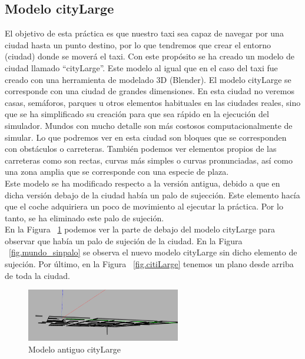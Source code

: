 \subsection{Modelo cityLarge}
El objetivo de esta práctica es que nuestro taxi sea capaz de navegar por una ciudad hasta un punto destino, por lo que tendremos que crear el entorno (ciudad) donde se moverá el taxi. Con este propósito se ha creado un modelo de ciudad llamado “cityLarge”. Este modelo al igual que en el caso del taxi fue creado con una herramienta de modelado 3D (Blender). El modelo cityLarge se corresponde con una ciudad de grandes dimensiones. En esta ciudad no veremos casas, semáforos, parques u otros elementos habituales en las ciudades reales, sino que se ha simplificado su creación para que sea rápido en la ejecución del simulador. Mundos con mucho detalle son más costosos computacionalmente de simular. Lo que podremos ver en esta ciudad son bloques que se corresponden con obstáculos o carreteras. También podemos ver elementos propios de las carreteras como son rectas, curvas más simples o curvas pronunciadas, así como una zona amplia que se corresponde con una especie de plaza.  \\

Este modelo se ha modificado respecto a la versión antigua, debido a que en dicha versión debajo de la ciudad había un palo de sujección. Este elemento hacía que el coche adquiriera un poco de movimiento al ejecutar la práctica. Por lo tanto, se ha eliminado este palo de sujeción. \\

En la Figura ~\ref{fig.mundo_palo} podemos ver la parte de debajo del modelo cityLarge para observar que había un palo de sujeción de la ciudad. En la Figura ~\ref{fig.mundo_sinpalo} se observa el nuevo modelo cityLarge sin dicho elemento de sujeción. Por último, en la Figura ~\ref{fig.citiLarge} tenemos un plano desde arriba de toda la ciudad.

\begin{figure}[H]
  \begin{center}
    \includegraphics[width=0.6\textwidth]{figures/GPP/Mundo_palo.png}
		\caption{Modelo antiguo cityLarge}
		\label{fig.mundo_palo}
		\end{center}
\end{figure}

